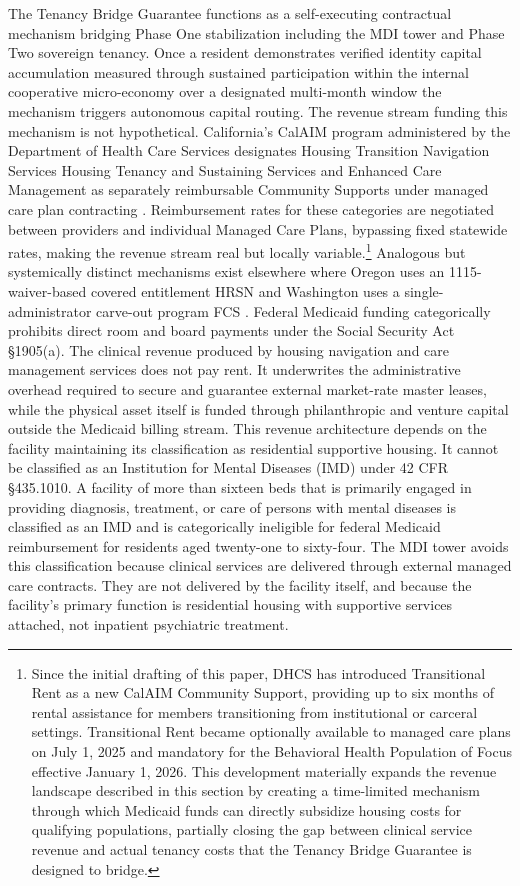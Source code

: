 \documentclass[12pt, letterpaper]{article}
\begin{document}
The Tenancy Bridge Guarantee functions as a self-executing contractual mechanism bridging Phase One stabilization including the MDI tower and Phase Two sovereign tenancy. Once a resident demonstrates verified identity capital accumulation measured through sustained participation within the internal cooperative micro-economy over a designated multi-month window the mechanism triggers autonomous capital routing. The revenue stream funding this mechanism is not hypothetical. California's CalAIM program administered by the Department of Health Care Services designates Housing Transition Navigation Services Housing Tenancy and Sustaining Services and Enhanced Care Management as separately reimbursable Community Supports under managed care plan contracting \citep{dhcs2025community, chcf2021pricing}. Reimbursement rates for these categories are negotiated between providers and individual Managed Care Plans, bypassing fixed statewide rates, making the revenue stream real but locally variable.\footnote{Since the initial drafting of this paper, DHCS has introduced Transitional Rent as a new CalAIM Community Support, providing up to six months of rental assistance for members transitioning from institutional or carceral settings. Transitional Rent became optionally available to managed care plans on July 1, 2025 and mandatory for the Behavioral Health Population of Focus effective January 1, 2026. This development materially expands the revenue landscape described in this section by creating a time-limited mechanism through which Medicaid funds can directly subsidize housing costs for qualifying populations, partially closing the gap between clinical service revenue and actual tenancy costs that the Tenancy Bridge Guarantee is designed to bridge.} Analogous but systemically distinct mechanisms exist elsewhere where Oregon uses an 1115-waiver-based covered entitlement HRSN \citep{oha2024hrsn} and Washington uses a single-administrator carve-out program FCS \citep{nashp2024managedcare}. Federal Medicaid funding categorically prohibits direct room and board payments under the Social Security Act \S 1905(a). The clinical revenue produced by housing navigation and care management services does not pay rent. It underwrites the administrative overhead required to secure and guarantee external market-rate master leases, while the physical asset itself is funded through philanthropic and venture capital outside the Medicaid billing stream. This revenue architecture depends on the facility maintaining its classification as residential supportive housing. It cannot be classified as an Institution for Mental Diseases (IMD) under 42 CFR \S 435.1010. A facility of more than sixteen beds that is primarily engaged in providing diagnosis, treatment, or care of persons with mental diseases is classified as an IMD and is categorically ineligible for federal Medicaid reimbursement for residents aged twenty-one to sixty-four. The MDI tower avoids this classification because clinical services are delivered through external managed care contracts. They are not delivered by the facility itself, and because the facility's primary function is residential housing with supportive services attached, not inpatient psychiatric treatment.
\end{document}
